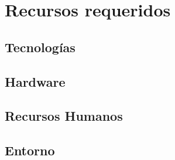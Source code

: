 \chapter{Recursos requeridos}
\section{Tecnologías}
\section{Hardware}
\section{Recursos Humanos}
\section{Entorno}